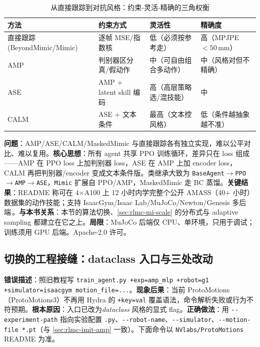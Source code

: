 \begin{table}[ht]
\centering
\small
\caption{从直接跟踪到对抗风格：约束-灵活-精确的三角权衡}
\label{tab:rlmc-mi-prior}
\begin{tabular}{@{}llll@{}}
\toprule
方法 & 约束方式 & 灵活性 & 精确度 \\
\midrule
直接跟踪 (BeyondMimic/Mimic) & 逐帧 MSE/指数核 & 低（必须按参考走） & 高（MPJPE $<50$\,mm） \\
AMP\,\cite{peng2021amp} & 判别器区分真/假动作 & 中（可自由组合多动作） & 中（风格对但不精确） \\
ASE\,\cite{peng2022ase} & AMP + latent skill 编码 & 高（高层策略选/混技能） & 中 \\
CALM\,\cite{tessler2023calm} & ASE + 文本条件 & 最高（文本控风格） & 低（条件越抽象越不准） \\
\bottomrule
\end{tabular}
\end{table}

\begin{paper}\label{paper:rlmc-mi-proto}
\textbf{问题}：AMP/ASE/CALM/MaskedMimic 与直接跟踪各有独立实现，难以公平对比、难以复用。\textbf{核心思想}：所有 agent 共享 PPO 训练循环，差异只在 loss 组成——AMP 在 PPO loss 上加判别器 loss，ASE 在 AMP 上加 encoder loss，CALM 再把判别器/encoder 变成文本条件版。类继承大致为 \verb|BaseAgent|$\to$\verb|PPO|$\to$\verb|AMP|$\to$\verb|ASE|，\verb|Mimic| 扩展自 PPO/AMP，MaskedMimic 走 BC 蒸馏。\textbf{关键结果}：README 称可在 4$\times$A100 上 12 小时内学完整个公开 AMASS（40+ 小时）数据集的动作技能；支持 IsaacGym/Isaac Lab/MuJoCo/Newton/Genesis 多后端\,\cite{protomotions2024}。\textbf{与本书关系}：本节的算法切换、\cref{sec:rlmc-mi-scale} 的分布式与 adaptive sampling 都建立在它之上。\textbf{局限}：MuJoCo 后端仅 CPU、单环境，只用于调试；训练须用 GPU 后端。Apache-2.0 许可。
\end{paper}

\subsection{切换的工程接缝：dataclass 入口与三处改动}
\label{sec:rlmc-mi-proto-switch}

\begin{pitfall}[ProtoMotions 已是 dataclass 入口，不要再用旧 Hydra \texttt{+exp=}]
\textbf{错误描述}：照旧教程写 \verb|train_agent.py +exp=amp_mlp +robot=g1 +simulator=isaacgym motion_file=...|。\textbf{现象后果}：当前 ProtoMotions（ProtoMotions3）不再用 Hydra 的 \verb|+key=val| 覆盖语法，命令解析失败或行为不符预期。\textbf{根本原因}：入口已改为\emph{dataclass} 风格的显式 flag。\textbf{正确做法}：用 \verb|--experiment-path| 指向实验配置 \verb|.py|、\verb|--robot-name|、\verb|--simulator|、\verb|--motion-file *.pt|（与 \cref{sec:rlmc-imit-amp} 一致）。下面命令以 \texttt{NVlabs/ProtoMotions} README 为准。
\end{pitfall}

